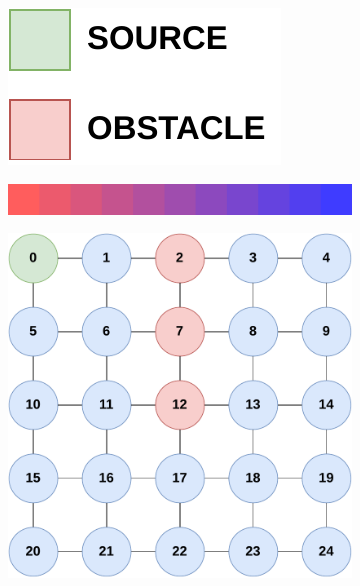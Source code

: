 \begin{figure}
    \centering
    \begin{subfigure}[b]{.15\textwidth}
        \centering
        \includegraphics[width=\textwidth]{figures/gradient-environment-legend.pdf}
        \label{fig:gradient-legend}
    \end{subfigure}
    \hfill
    \begin{subfigure}[b]{.49\textwidth}
        \centering
        \includegraphics[width=\textwidth]{figures/palette-cropped2.png}
        \label{fig:gradient-palette}
    \end{subfigure}
    \hfill
    \begin{subfigure}[b]{.49\textwidth}
        \centering
        \includegraphics[width=\textwidth]{figures/gradient-environment.pdf}

\end{subfigure}
\end{figure}
